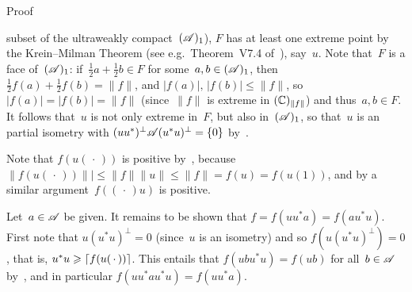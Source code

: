 \documentclass[a]{subfiles}
\begin{document}
\begin{parsec}
\begin{point}
\begin{point}{Proof}
\begin{point}
subset of the ultraweakly compact~$(\mathscr{A})_1$),
$F$ has at least one extreme point
by the Krein--Milman Theorem
(see e.g.~Theorem~V7.4 of~\cite{conway2013}), say~$u$.
Note that~$F$ is a face of~$(\mathscr{A})_1$:
if~$\frac{1}{2}a+\frac{1}{2}b\in F$ for some~$a,b\in(\mathscr{A})_1$,
then $\frac{1}{2}f(a)+\frac{1}{2}f(b) = \|f\|$,
and $\left|f(a)\right|,\,\left|f(b)\right|\leq \|f\|$,
so~$\left|f(a)\right|=\left|f(b)\right|=\|f\|$
(since~$\|f\|$ is extreme in $(\mathbb{C})_{\|f\|}$)
and thus~$a,b\in F$.
It follows that~$u$ is not only extreme in~$F$, but also in~$(\mathscr{A})_1$,
so that~$u$ is an partial isometry with $(uu^*)^\perp\mathscr{A}(u^*u)^\perp=\{0\}$
by~.

Note that $f(u(\,\cdot\,))$
is positive by~, because
$\|f(u(\,\cdot\,))\||\leq\|f\|\|u\|\leq\|f\|=f(u)=f(u(1))$,
and by a similar argument~$f((\,\cdot\,)u)$
is positive.

Let~$a\in\mathscr{A}$ be given.
It remains to be shown that $f=f(uu^*a)=f(au^*u)$.
First note that  $u(u^*u)^\perp = 0$ (since~$u$ is an isometry)
and so $f(u(u^*u)^\perp)=0$,
that is,  $u^*u\geqslant \left\lceil f(u(\,\cdot\,))\right\rceil$.
This entails that $f(ubu^*u)=f(ub)$ for all~$b\in\mathscr{A}$
by~, and in particular $f(uu^*au^*u)=f(uu^*a)$.


\end{point}
\end{point}
\end{point}
\end{parsec}
\end{document}

